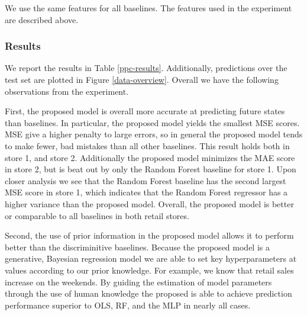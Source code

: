 We use the same features for all baselines. The features used in the experiment are described above.

\subsubsection{Results}

We report the results in Table \ref{ppc-results}. Additionally, predictions over the test set are plotted in Figure \ref{data-overview}. Overall we have the following observations from the experiment.

First, the proposed model is overall more accurate at predicting future states than baselines.  In particular, the proposed model yields the smallest MSE scores. MSE give a higher penalty to large errors, so in general the proposed model tends to make fewer, bad mistakes than all other baselines. This result holds both in store 1, and store 2. Additionally the proposed model minimizes the MAE score in store 2, but  is beat out by only the Random Forest baseline for store 1. Upon closer analysis we see that the Random Forest baseline has the second largest MSE score in store 1, which indicates that the Random Forest regressor has a higher variance than the proposed model. Overall, the proposed model is better or comparable to all baselines in both retail stores.

Second, the use of prior information in the proposed model allows it to perform better than the discriminitive baselines. Because the proposed model is a generative, Bayesian regression model we are able to set key hyperparameters at values according to our prior knowledge. For example, we know that retail sales increase on the weekends. By guiding the estimation of model parameters through the use of human knowledge the proposed is able to achieve prediction performance superior to OLS, RF, and the MLP in nearly all cases.

